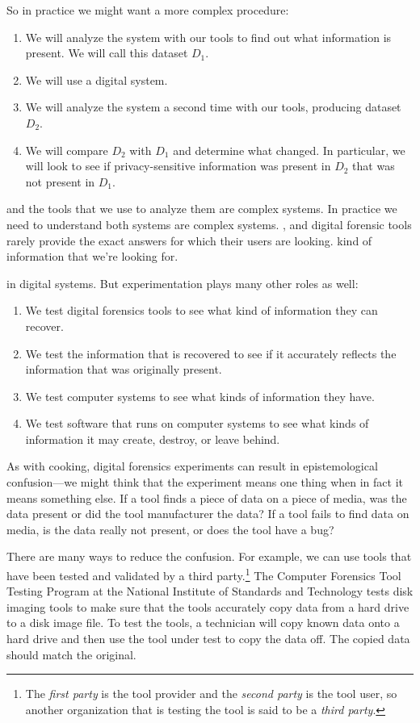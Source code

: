 {So in practice we might want a more complex procedure:

\begin{enumerate}
\item We will analyze the system with our tools to find out what
  information is present. We will call this dataset $D_1$. 
\item We will use a digital system.
\item We will analyze the system a second time with our tools,
  producing dataset $D_2$. 
\item We will compare $D_2$ with $D_1$ and determine what changed. In
  particular, we will look to see if privacy-sensitive information was
  present in $D_2$ that was not present in $D_1$. 
\end{enumerate}



and
the tools that we use to analyze them are complex systems. In practice
we need to understand both systems are
complex systems. , and digital forensic tools rarely provide the
exact answers for which their users are looking. kind of information that we're looking for. 

in
digital systems. But experimentation plays many other roles as well:



\begin{enumerate}
\item We test digital forensics tools to see what kind of information they can recover.
\item We test the information that is recovered to see if it
  accurately reflects the information that was originally present.
\item We test computer systems to see what kinds of information they have.
\item We test software that runs on computer systems to see what kinds
  of information it may create, destroy, or leave behind.
\end{enumerate}

As with cooking, digital forensics experiments can result in epistemological
confusion---we might think that the experiment means one thing when in
fact it means something else. If a tool finds a piece of data on a piece of media, was
the data present or did the tool manufacturer the data? If a tool
fails to find data on media, is the data really not present, or does
the tool have a bug?

There are many ways to reduce the confusion. For example, we can use
tools that have been
tested and validated by a third party.\footnote{The \emph{first party}
  is the tool provider and the \emph{second party} is the tool user,
  so another organization that is testing the tool is said to be a
  \emph{third party}.} The Computer Forensics Tool
Testing Program at the National Institute of
Standards and Technology tests disk imaging tools to make sure that
the tools accurately copy data from a hard drive to a disk image
file. To test the tools, a technician will copy known data onto a hard
drive and then use the tool under test to copy the data off. The copied data
should match the original.

}
